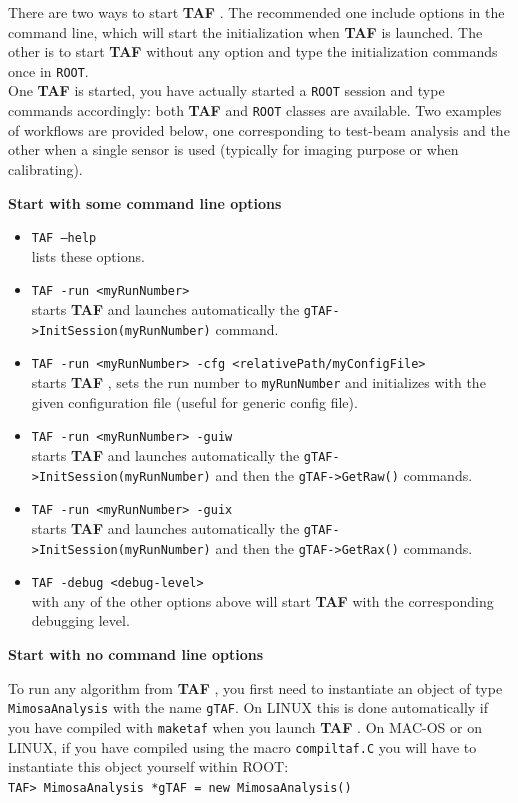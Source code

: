 \documentclass[a4paper, 12pt, twoside]{article}
\newcommand{\TAF}{{\bf TAF }}
\begin{document}
There are two ways to start \TAF. The recommended one include options in the command line, which will start the initialization when \TAF is launched. The other is to start \TAF without any option and type the initialization commands once in {\tt ROOT}.\\
One \TAF is started, you have actually started a {\tt ROOT} session and type commands accordingly: both \TAF and {\tt ROOT} classes are available. Two examples of workflows are provided below, one corresponding to test-beam analysis and the other when a single sensor is used (typically for imaging purpose or when calibrating).

\noindent
{\bf Start with some command line options}

\noindent
\begin{itemize}
\item {\tt TAF --help}\\ lists these options.
\item {\tt TAF -run <myRunNumber>}\\
 starts \TAF and launches automatically the {\tt gTAF->InitSession(myRunNumber)} command.
\item {\tt  TAF  -run <myRunNumber> -cfg <relativePath/myConfigFile>}\\
 starts \TAF, sets the run number to {\tt myRunNumber} and initializes with the given configuration file (useful for generic config file).
\item {\tt TAF -run <myRunNumber> -guiw}\\
 starts \TAF and launches automatically the {\tt gTAF->InitSession(myRunNumber)} and then the {\tt gTAF->GetRaw()} commands.
\item {\tt TAF -run <myRunNumber> -guix}\\
 starts \TAF and launches automatically the {\tt gTAF->InitSession(myRunNumber)} and then the {\tt gTAF->GetRax()} commands.
\item {\tt TAF -debug <debug-level>}\\
 with any of the other options above will start \TAF with the corresponding debugging level.
\end{itemize}

\vspace{0.8 cm}

\noindent
{\bf Start with no command line options}

\noindent
To run any algorithm from \TAF, you first need to instantiate an object of type {\tt MimosaAnalysis} with the name {\tt gTAF}. On LINUX this is done automatically if you have compiled with {\tt maketaf} when you launch \TAF . On MAC-OS or on LINUX, if you have compiled using the macro {\tt compiltaf.C} you will have to instantiate this object yourself within ROOT:\\
{\tt TAF> MimosaAnalysis *gTAF = new MimosaAnalysis()}\\
\end{document}
